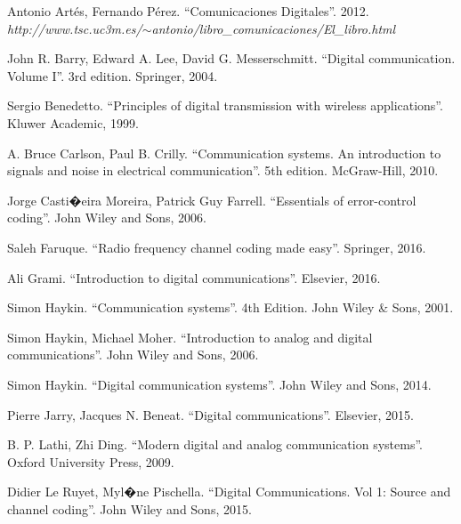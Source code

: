 \documentclass[es,apuntes]{uah}
\begin{document}

\maketitle


\begin{thebibliography}{100}

 Antonio Artés, Fernando Pérez. ``Comunicaciones Digitales''. 2012. \emph{http://www.tsc.uc3m.es/$\sim$antonio/libro\_comunicaciones/El\_libro.html}

 John R. Barry, Edward A. Lee, David G. Messerschmitt. ``Digital communication. Volume I''. 3rd edition. Springer, 2004.  

 Sergio Benedetto. ``Principles of digital transmission with wireless applications''. Kluwer Academic, 1999.

 A. Bruce Carlson, Paul B. Crilly. ``Communication systems. An introduction to signals and noise in electrical communication''. 5th edition. McGraw-Hill, 2010.

 Jorge Casti�eira Moreira, Patrick Guy Farrell. ``Essentials of error-control coding''. John Wiley and Sons, 2006.

 Saleh Faruque. ``Radio frequency channel coding made easy''. Springer, 2016.

 Ali Grami. ``Introduction to digital communications''. Elsevier, 2016.

 Simon Haykin. ``Communication systems''. 4th Edition. John Wiley \& Sons, 2001.

 Simon Haykin, Michael Moher. ``Introduction to analog and digital communications''. John Wiley and Sons, 2006.

 Simon Haykin. ``Digital communication systems''. John Wiley and Sons, 2014.

 Pierre Jarry, Jacques N. Beneat. ``Digital communications''. Elsevier, 2015.

 B. P. Lathi, Zhi Ding. ``Modern digital and analog communication systems''. Oxford University Press, 2009.

 Didier Le Ruyet, Myl�ne Pischella. ``Digital Communications. Vol 1: Source and channel coding''. John Wiley and Sons, 2015.


\end{thebibliography}
\end{document}
